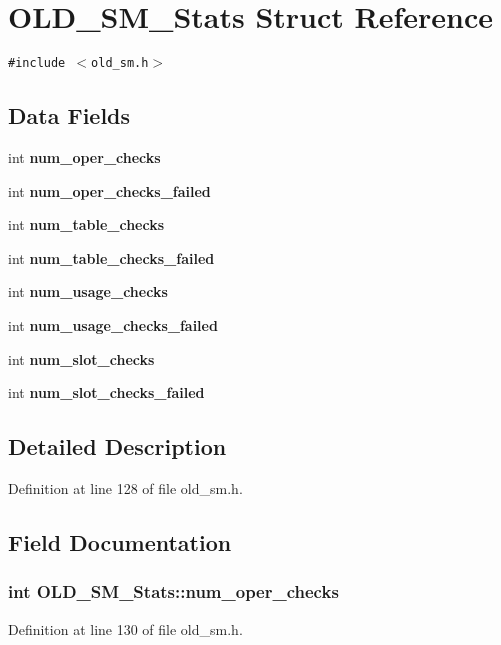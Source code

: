 \section{OLD\_\-SM\_\-Stats Struct Reference}
\label{structOLD__SM__Stats}
{\tt \#include $<$old\_\-sm.h$>$}

\subsection*{Data Fields}
\begin{CompactItemize}
\item 
int \bf{num\_\-oper\_\-checks}
\item 
int \bf{num\_\-oper\_\-checks\_\-failed}
\item 
int \bf{num\_\-table\_\-checks}
\item 
int \bf{num\_\-table\_\-checks\_\-failed}
\item 
int \bf{num\_\-usage\_\-checks}
\item 
int \bf{num\_\-usage\_\-checks\_\-failed}
\item 
int \bf{num\_\-slot\_\-checks}
\item 
int \bf{num\_\-slot\_\-checks\_\-failed}
\end{CompactItemize}


\subsection{Detailed Description}




Definition at line 128 of file old\_\-sm.h.

\subsection{Field Documentation}
\subsubsection{\setlength{\rightskip}{0pt plus 5cm}int \bf{OLD\_\-SM\_\-Stats::num\_\-oper\_\-checks}}\label{structOLD__SM__Stats_5da508a4b660f1e480ad45c1f127f00a}




Definition at line 130 of file old\_\-sm.h.
